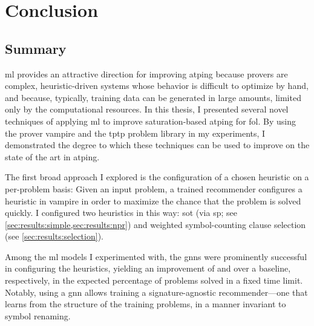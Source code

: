 \chapter{Conclusion}



\section{Summary}

\Gls{ml} provides an attractive direction for improving \gls{atping} because provers are complex, heuristic-driven systems whose behavior is difficult to optimize by hand,
and because, typically, training data can be generated in large amounts, limited only by the computational resources.
In this thesis,
I presented several novel techniques of applying \gls{ml} to improve saturation-based \gls{atping} for \gls{fol}.
By using the prover \gls{vampire} and the \gls{tptp} problem library in my experiments,
I demonstrated the degree to which these techniques can be used to improve on the state of the art in \gls{atping}.

The first broad approach I explored is the configuration of a chosen heuristic on a per-problem basis:
Given an input problem, a trained recommender configures a heuristic in \gls{vampire} in order to maximize the chance that the problem is solved quickly.
I configured two heuristics in this way:
\gls{sot} (via \gls{sp}; see \cref{sec:results:simple,sec:results:npr}) and weighted symbol-counting clause selection (see \cref{sec:results:selection}).

Among the \gls{ml} models I experimented with,
the \glspl{gnn} were prominently successful in configuring the heuristics,
yielding an improvement of  and  over a baseline, respectively, in the expected percentage of problems solved in a fixed time limit.
Notably, using a \gls{gnn} allows training a signature-agnostic recommender---one that learns from the structure of the training problems, in a manner invariant to symbol renaming.

